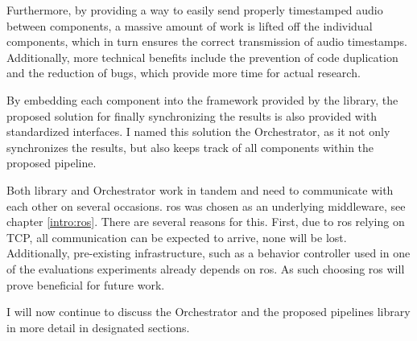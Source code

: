Furthermore, by providing a way to easily send properly timestamped audio between components, a massive amount of work is lifted off the individual components, which in turn ensures the correct transmission of audio timestamps.
Additionally, more technical benefits include the prevention of code duplication and the reduction of bugs, which provide more time for actual research.

By embedding each component into the framework provided by the library, the proposed solution for finally synchronizing the results is also provided with standardized interfaces.
I named this solution the Orchestrator, as it not only synchronizes the results, but also keeps track of all components within the proposed pipeline.

Both library and Orchestrator work in tandem and need to communicate with each other on several occasions.
\gls{ros} was chosen as an underlying middleware, see chapter \ref{intro:ros}.
There are several reasons for this.
First, due to \gls{ros} relying on TCP, all communication can be expected to arrive, none will be lost.
Additionally, pre-existing infrastructure, such as a behavior controller used in one of the evaluations experiments already depends on \gls{ros}.
As such choosing \gls{ros} will prove beneficial for future work.

I will now continue to discuss the Orchestrator and the proposed pipelines library in more detail in designated sections.



\newpage

\newpage

